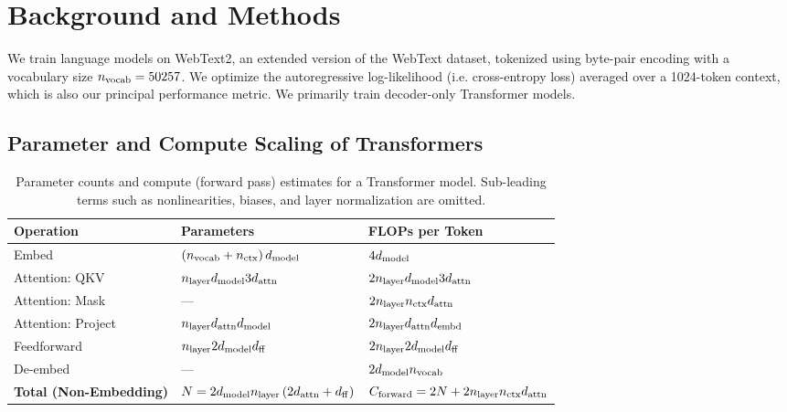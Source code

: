 \documentclass[english]{article}
\begin{document}
\section{Background and Methods}

We train language models on WebText2, an extended version of the WebText \cite{radford2019language} dataset, tokenized using byte-pair encoding \cite{BPE} with a vocabulary size $n_{\rm vocab} = 50257$.  We optimize the autoregressive log-likelihood (i.e. cross-entropy loss) averaged over a 1024-token context, which is also our principal performance metric.  We primarily train decoder-only \cite{liu2018generating, radford2018improving} Transformer \cite{OriginalTransformer} models.

\subsection{Parameter and Compute Scaling of Transformers}
\label{sec:ParameterComputeCounts}


\begin{table}[t!]
\centering
\begin{tabular}{|l|l|l|}
\hline 
\textbf{Operation}  & \textbf{Parameters}  & \textbf{FLOPs per Token}\tabularnewline
\hline 
\hline 
Embed  & $\left(n_{{\rm vocab}} + n_{{\rm ctx}}\right)d_{{\rm model}}$  & $4d_{{\rm model}}$\tabularnewline
\hline 
Attention: QKV  & $n_{{\rm layer}}d_{{\rm model}}3d_{{\rm attn}}$  & $2n_{{\rm layer}}d_{{\rm model}}3d_{{\rm attn}}$\tabularnewline
\hline 
Attention: Mask & ---  & $2n_{{\rm layer}}n_{{\rm ctx}}d_{{\rm attn}}$\tabularnewline
\hline 
Attention: Project & $n_{{\rm layer}}d_{{\rm attn}}d_{{\rm model}}$  & $2n_{{\rm layer}}d_{{\rm attn}}d_{{\rm embd}}$\tabularnewline
\hline 
Feedforward  & $n_{{\rm layer}}2d_{{\rm model}}d_{{\rm ff}}$ & $2n_{{\rm layer}}2d_{{\rm model}}d_{{\rm ff}}$\tabularnewline
\hline 
De-embed  & ---  & $2d_{{\rm model}}n_{{\rm vocab}}$\tabularnewline
\hline 
\hline 
\textbf{Total (Non-Embedding)} & $N=2d_{{\rm model}}n_{{\rm layer}}\left(2d_{{\rm attn}}+d_{{\rm ff}}\right)$  & $C_{\mathrm{forward}}=2N+2n_{{\rm layer}}n_{{\rm ctx}}d_{{\rm attn}}$\tabularnewline
\hline 
\end{tabular}
\vspace{1em}
\caption[Parameter and compute counts for Transformer]{Parameter counts and compute (forward pass) estimates for a Transformer model.  Sub-leading terms such as nonlinearities, biases, and layer normalization are omitted. \label{tab:TableTransformerParamsFLOPs}}
\end{table}
\end{document}
